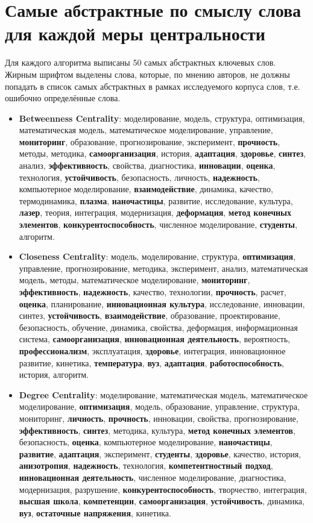 \chapter{Самые абстрактные по смыслу слова для каждой меры
центральности} \label{AppendixA}
Для каждого алгоритма выписаны 50 самых абстрактных ключевых слов. Жирным шрифтом выделены слова, которые, по мнению авторов, не должны попадать в список самых абстрактных в рамках исследуемого корпуса слов, т.е. ошибочно определённые слова.
\begin{itemize}
    \item \textbf{Betweenness Centrality}: моделирование, модель, структура, оптимизация, математическая модель, математическое моделирование, управление, \textbf{мониторинг}, образование, прогнозирование, эксперимент, \textbf{прочность}, методы, методика, \textbf{самоорганизация}, история, \textbf{адаптация}, \textbf{здоровье}, \textbf{синтез}, анализ, \textbf{эффективность}, свойства, диагностика, \textbf{инновации}, \textbf{оценка}, технология, \textbf{устойчивость}, безопасность, личность, \textbf{надежность}, компьютерное моделирование, \textbf{взаимодействие}, динамика, качество, термодинамика, \textbf{плазма}, \textbf{наночастицы}, развитие, исследование, культура, \textbf{лазер}, теория, интеграция, модернизация, \textbf{деформация}, \textbf{метод конечных элементов}, \textbf{конкурентоспособность}, численное моделирование, \textbf{студенты}, алгоритм.
    \item \textbf{Closeness Centrality}: модель, моделирование, структура, \textbf{оптимизация}, управление, прогнозирование, методика, эксперимент, анализ, математическая модель, методы, математическое моделирование, \textbf{мониторинг}, \textbf{эффективность}, \textbf{надежность}, качество, технологии, \textbf{прочность}, расчет, \textbf{оценка}, планирование, \textbf{инновационная культура}, исследование, инновации, синтез, \textbf{устойчивость}, \textbf{взаимодействие}, образование, проектирование, безопасность, обучение, динамика, свойства, деформация, информационная система, \textbf{самоорганизация}, \textbf{инновационная деятельность}, вероятность, \textbf{профессионализм}, эксплуатация, \textbf{здоровье}, интеграция, инновационное развитие, кинетика, \textbf{температура}, \textbf{вуз}, \textbf{адаптация}, \textbf{работоспособность}, история, алгоритм.
    \item \textbf{Degree Centrality}: моделирование, математическая модель, математическое моделирование, \textbf{оптимизация}, модель, образование, управление, структура, мониторинг, \textbf{личность}, \textbf{прочность}, инновации, свойства, прогнозирование, \textbf{эффективность}, \textbf{синтез}, методика, культура, \textbf{метод конечных элементов}, безопасность, \textbf{оценка}, компьютерное моделирование, \textbf{наночастицы}, \textbf{развитие}, \textbf{адаптация}, эксперимент, \textbf{студенты}, \textbf{здоровье}, качество, история, \textbf{анизотропия}, \textbf{надежность}, технология, \textbf{компетентностный подход}, \textbf{инновационная деятельность}, численное моделирование, диагностика, модернизация, разрушение, \textbf{конкурентоспособность}, творчество, интеграция, \textbf{высшая школа}, \textbf{компетенции}, \textbf{самоорганизация}, \textbf{устойчивость}, динамика, \textbf{вуз}, \textbf{остаточные напряжения}, кинетика.

\end{itemize}

